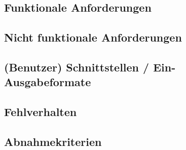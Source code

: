 \subsection{Funktionale Anforderungen}

\subsection{ Nicht funktionale Anforderungen}

\subsection{(Benutzer) Schnittstellen / Ein-Ausgabeformate}

\subsection{Fehlverhalten}

\subsection{Abnahmekriterien}
